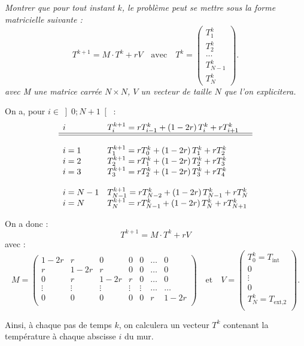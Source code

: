 \documentclass[10pt,fleqn]{article} %
\begin{document}
\subparagraph{}\textit{Montrer que pour tout instant $k$, le problème peut se mettre sous la forme matricielle suivante : }
$$
T^{k+1} = M \cdot T^k + rV \quad \text{avec} \quad T^k =
 \begin{pmatrix} T_1^k \\  T_2 ^k \\ ... \\  T_{N-1}^{k} \\ T_{N}^{k}  \end{pmatrix}.
$$
\textit{avec M une matrice carrée $N\times N$, $V$ un vecteur de taille $N$ que l'on explicitera.}
\ifprof
\begin{corrige}
On a, pour $i\in \left]0;N+1 \right[$ :
$$
\begin{array}{ll}
i & T_{i}^{k+1} = r T_{i-1}^{k} + \left( 1-2r \right) T_i^k + r T_{i+1}^k \\
\hline 
\hline 
\\
i=1 & T_{1}^{k+1} = r T_{0}^{k} + \left( 1-2r \right) T_1^k + r T_{2}^k \\
i=2 & T_{2}^{k+1} = r T_{1}^{k} + \left( 1-2r \right) T_2^k + r T_{3}^k \\
i=3 & T_{3}^{k+1} = r T_{2}^{k} + \left( 1-2r \right) T_3^k + r T_{4}^k \\
&\\
i=N -1& T_{N -1}^{k+1} = r T_{N -2}^{k} + \left( 1-2r \right) T_{N -1}^k + r T_{N}^k \\
i=N & T_{N}^{k+1} = r T_{N-1}^{k} + \left( 1-2r \right) T_N^k + r T_{N+1}^k \\
\end{array}
$$ 

On a donc : 
$$
T^{k+1} = M \cdot T^k + rV
$$
avec :
$$
M = 
\begin{pmatrix}
1-2r & r     & 0 & 0 & 0 &  \ldots & 0 \\
r     & 1-2r & r & 0 & 0  & \ldots &  0 \\
0    & r & 1-2r & r & 0   & \ldots&  0 \\
\vdots & \vdots & \vdots & \vdots & \vdots & \ldots & \ldots \\
0& 0& 0& 0& 0& r & 1-2r\\
\end{pmatrix}
\quad \text{et} \quad 
V = \begin{pmatrix}
T_0^k = T_{\text{int}} \\
0 \\
\vdots \\
0 \\
T_N^k = T_{\text{ext,2}} \\
\end{pmatrix}.
$$
\end{corrige}
\else
\fi
\ifprof
\else
\vspace{.5cm}
Ainsi, à chaque pas de temps $k$, on calculera un vecteur $T^k$ contenant la température à chaque abscisse $i$ du mur.
\end{document}
